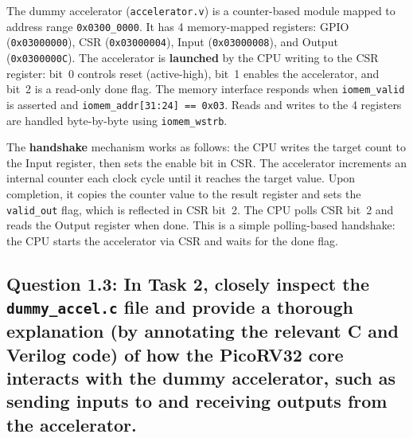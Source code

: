 \documentclass{article}
\begin{document}
\begin{tcolorbox}[colback=white, colframe=black, width=\textwidth, title=Answer 1.2]

The dummy accelerator (\texttt{accelerator.v}) is a counter-based module mapped to address range \texttt{0x0300\_0000}. It has 4 memory-mapped registers: GPIO (\texttt{0x03000000}), CSR (\texttt{0x03000004}), Input (\texttt{0x03000008}), and Output (\texttt{0x0300000C}). The accelerator is \textbf{launched} by the CPU writing to the CSR register: bit~0 controls reset (active-high), bit~1 enables the accelerator, and bit~2 is a read-only done flag. The memory interface responds when \texttt{iomem\_valid} is asserted and \texttt{iomem\_addr[31:24] == 0x03}. Reads and writes to the 4 registers are handled byte-by-byte using \texttt{iomem\_wstrb}.

\vspace{0.2cm}

The \textbf{handshake} mechanism works as follows: the CPU writes the target count to the Input register, then sets the enable bit in CSR. The accelerator increments an internal counter each clock cycle until it reaches the target value. Upon completion, it copies the counter value to the result register and sets the \texttt{valid\_out} flag, which is reflected in CSR bit~2. The CPU polls CSR bit~2 and reads the Output register when done. This is a simple polling-based handshake: the CPU starts the accelerator via CSR and waits for the done flag.

\end{tcolorbox}

\subsection*{Question 1.3: In Task 2, closely inspect the \texttt{dummy\_accel.c} file and provide a thorough explanation (by annotating the relevant C and Verilog code) of how the PicoRV32 core interacts with the dummy accelerator, such as sending inputs to and receiving outputs from the accelerator.}
\end{document}

